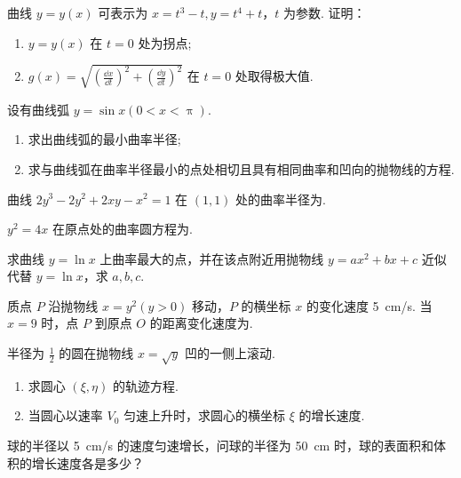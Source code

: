 	\begin{ti}
		曲线 $y = y(x)$ 可表示为 $x = t^{3} - t, y = t^{4} + t$，$t$ 为参数. 证明：
		\begin{enumerate}
			\item $y = y(x)$ 在 $t = 0$ 处为拐点;
			\item $g(x) = \sqrt{\left( \frac{\dd{x}}{\dd{t}} \right)^{2} + \left( \frac{\dd{y}}{\dd{t}} \right)^{2}}$ 在 $t = 0$ 处取得极大值.
		\end{enumerate}
	\end{ti}

	\begin{ti}
		设有曲线弧 $y = \sin x(0 < x < \uppi)$.
		\begin{enumerate}
			\item 求出曲线弧的最小曲率半径;
			\item 求与曲线弧在曲率半径最小的点处相切且具有相同曲率和凹向的抛物线的方程.
		\end{enumerate}
	\end{ti}

	\begin{ti}
		曲线 $2y^{3} - 2y^{2} + 2xy - x^{2} = 1$ 在 $(1,1)$ 处的曲率半径为\htwo.
	\end{ti}

	\begin{ti}
		$y^{2} = 4x$ 在原点处的曲率圆方程为\htwo.
	\end{ti}

	\begin{ti}
		求曲线 $y = \ln x$ 上曲率最大的点，并在该点附近用抛物线 $y = ax^{2} + bx + c$ 近似代替 $y = \ln x$，求 $a,b,c$.
	\end{ti}

	\begin{ti}
		质点 $P$ 沿抛物线 $x = y^{2}(y > 0)$ 移动，$P$ 的横坐标 $x$ 的变化速度 \SI{5}{cm/s}. 当 $x = 9$ 时，点 $P$ 到原点 $O$ 的距离变化速度为\htwo.
	\end{ti}

	\begin{ti}
		半径为 $\frac{1}{2}$ 的圆在抛物线 $x = \sqrt{y}$ 凹的一侧上滚动.
		\begin{enumerate}
			\item 求圆心 $(\xi,\eta)$ 的轨迹方程.
			\item 当圆心以速率 $V_{0}$ 匀速上升时，求圆心的横坐标 $\xi$ 的增长速度.
		\end{enumerate}
	\end{ti}

	\begin{ti}
		球的半径以 \SI{5}{cm/s} 的速度匀速增长，问球的半径为 \SI{50}{cm} 时，球的表面积和体积的增长速度各是多少？
	\end{ti}